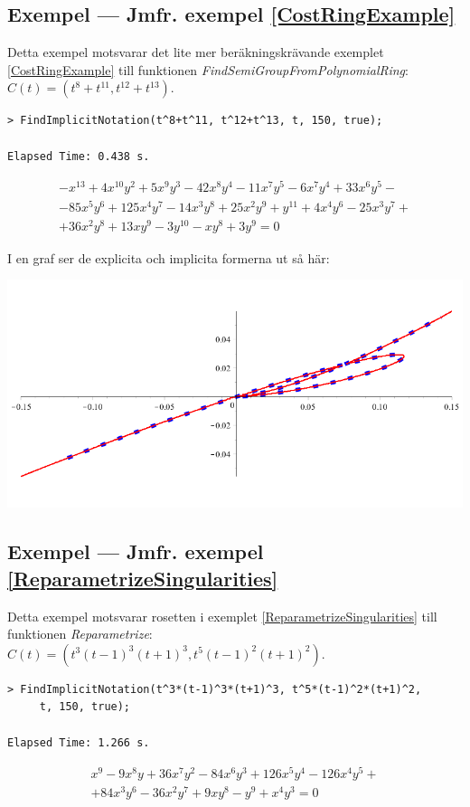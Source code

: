 \subsection{Exempel --- Jmfr. exempel \ref{CostRingExample}}

Detta exempel motsvarar det lite mer beräkningskrävande exemplet \ref{CostRingExample} till funktionen \emph{FindSemiGroupFromPolynomialRing}: $C(t)=\left(t^8+t^{11},t^{12}+t^{13}\right)$.

\begin{verbatim}
> FindImplicitNotation(t^8+t^11, t^12+t^13, t, 150, true);

Elapsed Time: 0.438 s.
\end{verbatim}
\[
\begin{array}{l}
-x^{13}+4x^{10}y^2+5x^9y^3-42x^8y^4-11x^7y^5-6x^7y^4+33x^6y^5-\\
-85x^5y^6+125x^4y^7-14x^3y^8+25x^2y^9+y^{11}+4x^4y^6-25x^3y^7+\\
+36x^2y^8+13xy^9-3y^{10}-xy^8+3y^9 = 0
\end{array}
\]

I en graf ser de explicita och implicita formerna ut så här:

\begin{center}
\includegraphics[scale=0.35]{Export/implicitplot5.png}
\end{center}

\subsection{Exempel --- Jmfr. exempel \ref{ReparametrizeSingularities}}

Detta exempel motsvarar rosetten i exemplet \ref{ReparametrizeSingularities} till funktionen \emph{Reparametrize}: $C(t)=\left(t^3(t - 1)^3(t + 1)^3,t^5(t - 1)^2(t + 1)^2\right)$.

\begin{verbatim}
> FindImplicitNotation(t^3*(t-1)^3*(t+1)^3, t^5*(t-1)^2*(t+1)^2, 
     t, 150, true);

Elapsed Time: 1.266 s.
\end{verbatim}
\[
\begin{array}{l}
x^9-9x^8y+36x^7y^2-84x^6y^3+126x^5y^4-126x^4y^5+\\
+84x^3y^6-36x^2y^7+9xy^8-y^9+x^4y^3 = 0
\end{array}
\]

